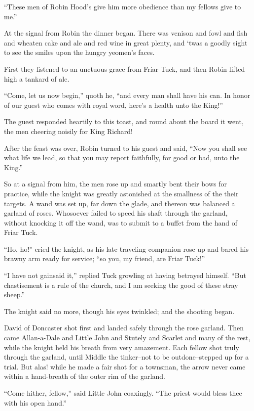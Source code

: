 ``These men of Robin Hood's give him more obedience than my fellows give
to me.''

At the signal from Robin the dinner began. There was venison and fowl
and fish and wheaten cake and ale and red wine in great plenty, and
`twas a goodly sight to see the smiles upon the hungry yeomen's faces.

First they listened to an unctuous grace from Friar Tuck, and then Robin
lifted high a tankard of ale.

``Come, let us now begin,'' quoth he, ``and every man shall have his
can. In honor of our guest who comes with royal word, here's a health
unto the King!''

The guest responded heartily to this toast, and round about the board it
went, the men cheering noisily for King Richard!

After the feast was over, Robin turned to his guest and said, ``Now you
shall see what life we lead, so that you may report faithfully, for good
or bad, unto the King.''

So at a signal from him, the men rose up and smartly bent their bows for
practice, while the knight was greatly astonished at the smallness of
the their targets. A wand was set up, far down the glade, and thereon
was balanced a garland of roses. Whosoever failed to speed his shaft
through the garland, without knocking it off the wand, was to submit to
a buffet from the hand of Friar Tuck.

``Ho, ho!'' cried the knight, as his late traveling companion rose up
and bared his brawny arm ready for service; ``so you, my friend, are
Friar Tuck!''

``I have not gainsaid it,'' replied Tuck growling at having betrayed
himself. ``But chastisement is a rule of the church, and I am seeking
the good of these stray sheep.''

The knight said no more, though his eyes twinkled; and the shooting
began.

David of Doncaster shot first and landed safely through the rose
garland. Then came Allan-a-Dale and Little John and Stutely and Scarlet
and many of the rest, while the knight held his breath from very
amazement. Each fellow shot truly through the garland, until Middle the
tinker--not to be outdone--stepped up for a trial. But alas! while he
made a fair shot for a townsman, the arrow never came within a
hand-breath of the outer rim of the garland.

``Come hither, fellow,'' said Little John coaxingly. ``The priest would
bless thee with his open hand.''

